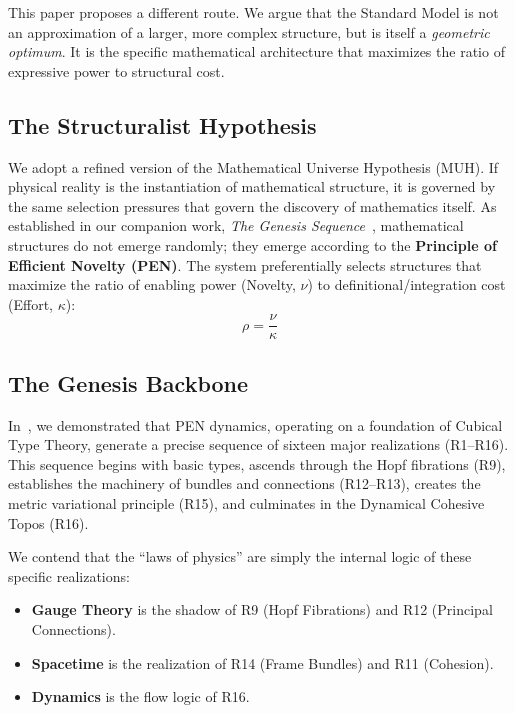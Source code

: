 \documentclass[12pt,a4paper]{article}
\theoremstyle{definition}
\newcommand{\kap}{\kappa}
\begin{document}
This paper proposes a different route. We argue that the Standard Model is not an approximation of a larger, more complex structure, but is itself a \emph{geometric optimum}. It is the specific mathematical architecture that maximizes the ratio of expressive power to structural cost.

\subsection{The Structuralist Hypothesis}

We adopt a refined version of the Mathematical Universe Hypothesis (MUH). If physical reality is the instantiation of mathematical structure, it is governed by the same selection pressures that govern the discovery of mathematics itself. As established in our companion work, \emph{The Genesis Sequence}~\cite{genesis}, mathematical structures do not emerge randomly; they emerge according to the \textbf{Principle of Efficient Novelty (PEN)}. The system preferentially selects structures that maximize the ratio of enabling power (Novelty, $\nu$) to definitional/integration cost (Effort, $\kap$):
\begin{equation}
    \rho = \frac{\nu}{\kap}
\end{equation}

\subsection{The Genesis Backbone}

In~\cite{genesis}, we demonstrated that PEN dynamics, operating on a foundation of Cubical Type Theory, generate a precise sequence of sixteen major realizations (R1--R16). This sequence begins with basic types, ascends through the Hopf fibrations (R9), establishes the machinery of bundles and connections (R12--R13), creates the metric variational principle (R15), and culminates in the Dynamical Cohesive Topos (R16).

We contend that the ``laws of physics'' are simply the internal logic of these specific realizations:
\begin{itemize}[leftmargin=2em]
    \item \textbf{Gauge Theory} is the shadow of R9 (Hopf Fibrations) and R12 (Principal Connections).
    \item \textbf{Spacetime} is the realization of R14 (Frame Bundles) and R11 (Cohesion).
    \item \textbf{Dynamics} is the flow logic of R16.
\end{itemize}
\end{document}
